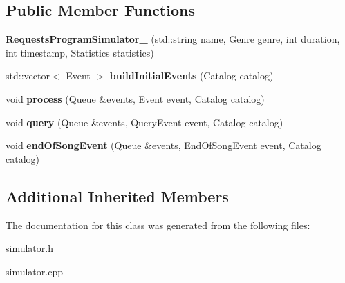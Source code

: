\subsection*{Public Member Functions}
\begin{DoxyCompactItemize}
\item 
{\bfseries Requests\+Program\+Simulator\+\_\+} (std\+::string name, Genre genre, int duration, int timestamp, Statistics statistics)\hypertarget{class_requests_program_simulator___a1f3dd84a16e1d2c4be1de818da52ad02}{}\label{class_requests_program_simulator___a1f3dd84a16e1d2c4be1de818da52ad02}

\item 
std\+::vector$<$ Event $>$ {\bfseries build\+Initial\+Events} (Catalog catalog)\hypertarget{class_requests_program_simulator___a6eb54b7d4e82be9b76e6bbd95e9ad0c0}{}\label{class_requests_program_simulator___a6eb54b7d4e82be9b76e6bbd95e9ad0c0}

\item 
void {\bfseries process} (Queue \&events, Event event, Catalog catalog)\hypertarget{class_requests_program_simulator___a49027fa17e72f83e835a6343e43dd2ec}{}\label{class_requests_program_simulator___a49027fa17e72f83e835a6343e43dd2ec}

\item 
void {\bfseries query} (Queue \&events, Query\+Event event, Catalog catalog)\hypertarget{class_requests_program_simulator___a3b4019d2f26735cf092bc99597df71b7}{}\label{class_requests_program_simulator___a3b4019d2f26735cf092bc99597df71b7}

\item 
void {\bfseries end\+Of\+Song\+Event} (Queue \&events, End\+Of\+Song\+Event event, Catalog catalog)\hypertarget{class_requests_program_simulator___aeaecfe74134600a0982321589481cf1c}{}\label{class_requests_program_simulator___aeaecfe74134600a0982321589481cf1c}

\end{DoxyCompactItemize}
\subsection*{Additional Inherited Members}


The documentation for this class was generated from the following files\+:\begin{DoxyCompactItemize}
\item 
simulator.\+h\item 
simulator.\+cpp\end{DoxyCompactItemize}
